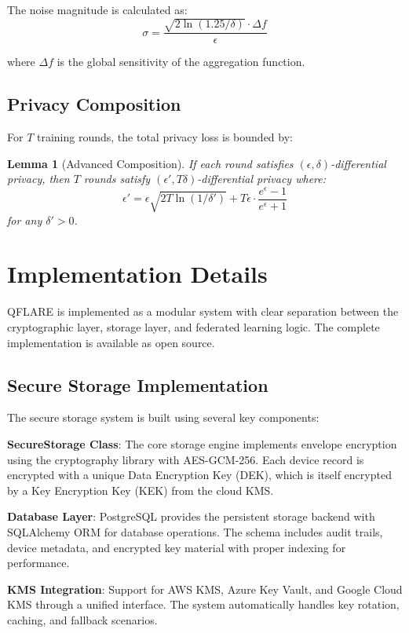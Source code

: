 \documentclass[onecolumn,11pt]{article}
\newtheorem{lemma}[theorem]{Lemma}
\begin{document}
The noise magnitude is calculated as:
$$\sigma = \frac{\sqrt{2\ln(1.25/\delta)} \cdot \Delta f}{\epsilon}$$

where $\Delta f$ is the global sensitivity of the aggregation function.

\subsection{Privacy Composition}

For $T$ training rounds, the total privacy loss is bounded by:

\begin{lemma}[Advanced Composition]
If each round satisfies $(\epsilon, \delta)$-differential privacy, then $T$ rounds satisfy $(\epsilon', T\delta)$-differential privacy where:
$$\epsilon' = \epsilon\sqrt{2T\ln(1/\delta')} + T\epsilon \cdot \frac{e^\epsilon - 1}{e^\epsilon + 1}$$
for any $\delta' > 0$.
\end{lemma}

\section{Implementation Details}
\label{sec:implementation}

QFLARE is implemented as a modular system with clear separation between the cryptographic layer, storage layer, and federated learning logic. The complete implementation is available as open source.

\subsection{Secure Storage Implementation}

The secure storage system is built using several key components:

\textbf{SecureStorage Class}: The core storage engine implements envelope encryption using the cryptography library with AES-GCM-256. Each device record is encrypted with a unique Data Encryption Key (DEK), which is itself encrypted by a Key Encryption Key (KEK) from the cloud KMS.

\textbf{Database Layer}: PostgreSQL provides the persistent storage backend with SQLAlchemy ORM for database operations. The schema includes audit trails, device metadata, and encrypted key material with proper indexing for performance.

\textbf{KMS Integration}: Support for AWS KMS, Azure Key Vault, and Google Cloud KMS through a unified interface. The system automatically handles key rotation, caching, and fallback scenarios.
\end{document}
